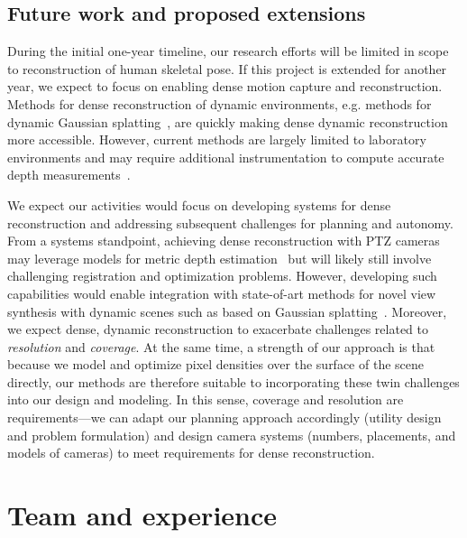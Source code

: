 \documentclass[11pt]{article}
\begin{document}

\subsection{Future work and proposed extensions}


During the initial one-year timeline, our research efforts will be limited in
scope to reconstruction of human skeletal pose.
If this project is extended for another year, we expect to focus on enabling
dense motion capture and reconstruction.
Methods for dense reconstruction of dynamic environments, e.g. methods for
dynamic Gaussian splatting~\citep{zheng2025cvpr}, are quickly making dense
dynamic reconstruction more accessible.
However, current methods are largely limited to laboratory environments and
may require additional instrumentation to compute accurate depth
measurements~\citep{zheng2025cvpr}.

We expect our activities would focus on developing systems for dense
reconstruction and addressing subsequent challenges for planning and autonomy.
From a systems standpoint, achieving dense reconstruction with PTZ cameras
may leverage models for metric depth estimation~\citep{ke2024cvpr}
but will likely still involve challenging registration and optimization
problems.
However, developing such capabilities would enable integration with
state-of-art methods for novel view synthesis with dynamic scenes such as based
on Gaussian splatting~\citep{zheng2025cvpr}.
Moreover, we expect dense, dynamic reconstruction to exacerbate challenges
related to \emph{resolution} and \emph{coverage}.
At the same time, a strength of our approach is that because we model and
optimize pixel densities over the surface of the scene directly, our methods are
therefore suitable to incorporating these twin challenges into our design and
modeling.
In this sense, coverage and resolution are requirements---we can adapt our
planning approach accordingly (utility design and problem formulation) and
design camera systems (numbers, placements, and models of cameras) to meet
requirements for dense reconstruction.

\section{Team and experience}
\end{document}
